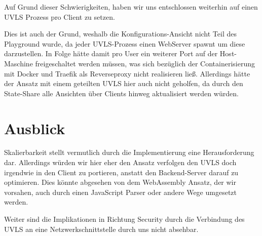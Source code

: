 \documentclass{article}
\begin{document}
Auf Grund dieser Schwierigkeiten, haben wir uns entschlossen weiterhin auf einen UVLS Prozess pro Client zu setzen. 

Dies ist auch der Grund, weshalb die Konfigurations-Ansicht nicht Teil des Playground wurde, da jeder UVLS-Prozess einen WebServer spawnt um diese darzustellen.
In Folge hätte damit pro User ein weiterer Port auf der Host-Maschine freigeschaltet werden müssen, was sich bezüglich der Containerisierung mit Docker und Traefik als Reverseproxy nicht realisieren ließ.
Allerdings hätte der Ansatz mit einem geteilten UVLS hier auch nicht geholfen, da durch den State-Share alle Ansichten über Clients hinweg aktualisiert werden würden.

\section{Ausblick}
Skalierbarkeit stellt vermutlich durch die Implementierung eine Herausforderung dar.
Allerdings würden wir hier eher den Ansatz verfolgen den UVLS doch irgendwie in den Client zu portieren, anstatt den Backend-Server darauf zu optimieren.
Dies könnte abgesehen von dem WebAssembly Ansatz, der wir vorsahen, auch durch einen JavaScript Parser oder andere Wege umgesetzt werden.

Weiter sind die Implikationen in Richtung Security durch die Verbindung des UVLS an eine Netzwerkschnittstelle durch uns nicht absehbar.
\end{document}
